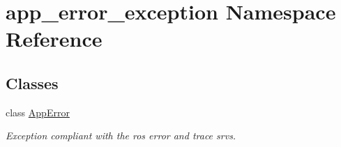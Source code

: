 \hypertarget{namespaceapp__error__exception}{\section{app\-\_\-error\-\_\-exception Namespace Reference}
\label{namespaceapp__error__exception}
}
\subsection*{Classes}
\begin{DoxyCompactItemize}
\item 
class \hyperlink{classapp__error__exception_1_1AppError}{App\-Error}
\begin{DoxyCompactList}\small\item\em Exception compliant with the ros error and trace srvs. \end{DoxyCompactList}\end{DoxyCompactItemize}
